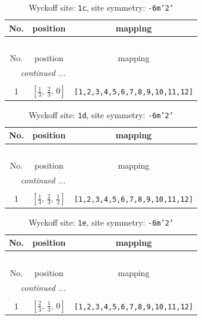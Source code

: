 \documentclass[fleqn,8pt]{jsarticle}
\begin{document}
\begin{longtable}{ccc}
\caption{Wyckoff site: {\tt 1c}, site symmetry: {\tt -6m'2'}}
 \\
 \hline \hline
No. & position & mapping \\ \hline \endfirsthead

\multicolumn{2}{l}{\tablename\ \thetable{}} \\
 \hline \hline
No. & position & mapping \\ \hline \endhead

 \hline \hline
\multicolumn{2}{r}{\footnotesize\it continued ...} \\ \endfoot

 \hline \hline
\multicolumn{2}{r}{} \\ \endlastfoot

1 & $\left[ \frac{1}{3},\, \frac{2}{3},\, 0 \right]$ & {\tt [1,2,3,4,5,6,7,8,9,10,11,12]} \\
\end{longtable}
\renewcommand{\arraystretch}{1.2}
\begin{longtable}{ccc}
\caption{Wyckoff site: {\tt 1d}, site symmetry: {\tt -6m'2'}}
 \\
 \hline \hline
No. & position & mapping \\ \hline \endfirsthead

\multicolumn{2}{l}{\tablename\ \thetable{}} \\
 \hline \hline
No. & position & mapping \\ \hline \endhead

 \hline \hline
\multicolumn{2}{r}{\footnotesize\it continued ...} \\ \endfoot

 \hline \hline
\multicolumn{2}{r}{} \\ \endlastfoot

1 & $\left[ \frac{1}{3},\, \frac{2}{3},\, \frac{1}{2} \right]$ & {\tt [1,2,3,4,5,6,7,8,9,10,11,12]} \\
\end{longtable}
\renewcommand{\arraystretch}{1.2}
\begin{longtable}{ccc}
\caption{Wyckoff site: {\tt 1e}, site symmetry: {\tt -6m'2'}}
 \\
 \hline \hline
No. & position & mapping \\ \hline \endfirsthead

\multicolumn{2}{l}{\tablename\ \thetable{}} \\
 \hline \hline
No. & position & mapping \\ \hline \endhead

 \hline \hline
\multicolumn{2}{r}{\footnotesize\it continued ...} \\ \endfoot

 \hline \hline
\multicolumn{2}{r}{} \\ \endlastfoot

1 & $\left[ \frac{2}{3},\, \frac{1}{3},\, 0 \right]$ & {\tt [1,2,3,4,5,6,7,8,9,10,11,12]} \\
\end{longtable}
\end{document}
